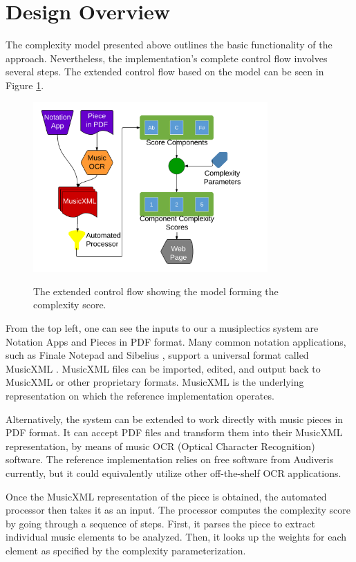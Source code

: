 \documentclass[12pt]{report}
\begin{document}
\section{Design Overview} 
\label{sec:design}

The complexity model presented above outlines the basic functionality of the approach. Nevertheless, the implementation's complete control flow involves several steps. The extended control flow based on the model can be seen in Figure \ref{image:flow}.

\begin{figure}[ht!]
	\centering
		\caption{The extended control flow showing the model forming the complexity score.}
		\includegraphics[width=0.8\textwidth]{JoinedCropped.png}
		\label{image:flow}
\end{figure}

From the top left, one can see the inputs to our a musiplectics system are Notation Apps and Pieces in PDF format. Many common notation applications, such as Finale Notepad \cite{FinaleNotepad} and Sibelius \cite{Sibelius}, support a universal format called MusicXML \cite{MusicXML} \cite{Good2001}. MusicXML files can be imported, edited, and output back to MusicXML or other proprietary formats. MusicXML is the underlying representation on which the reference implementation operates.

Alternatively, the system can be extended to work directly with music pieces in PDF format. It can accept PDF files and transform them into their MusicXML representation, by means of music OCR (Optical Character Recognition) software. The reference implementation relies on free software from Audiveris \cite{Audiveris} currently, but it could equivalently utilize other off-the-shelf OCR applications.

Once the MusicXML representation of the piece is obtained, the automated processor then takes it as an input. The processor computes the complexity score by going through a sequence of steps. First, it parses the piece to extract individual music elements to be analyzed. Then, it looks up the weights for each element as specified by the complexity parameterization.
\end{document}
